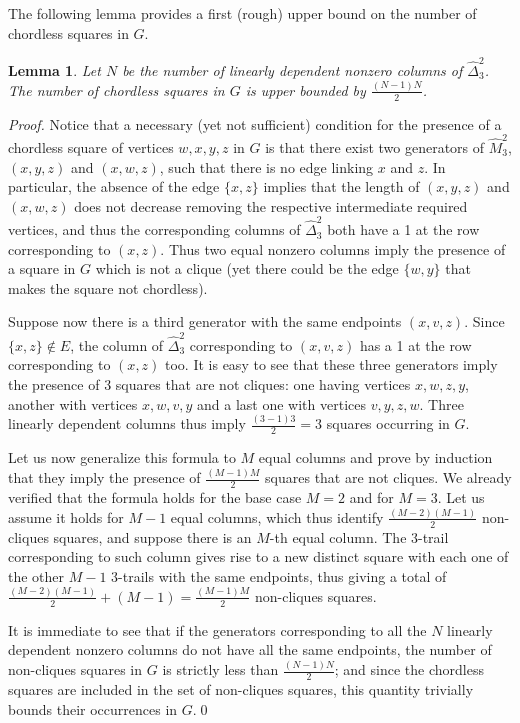 \documentclass{article}
\newtheorem{lemma}{Lemma}
\begin{document}
	The following lemma provides a first (rough) upper bound on the number of chordless squares in $G$.
	
	\begin{lemma}\label{lem:squares}
		Let $N$ be the number of linearly dependent nonzero columns of $\widehat{\Delta}_3^2$. The number of chordless squares in $G$ is upper bounded by $\frac{(N-1)N}{2}$.
	\end{lemma}
	\begin{proof}
		Notice that a necessary (yet not sufficient) condition for the presence of a chordless square of vertices $w,x,y,z$  in $G$ is that there exist two generators of $\widehat{M}_3^2$, $(x,y,z)$ and $(x,w,z)$, such that there is no edge linking $x$ and $z$. In particular, the absence of the edge $\{x,z\}$ implies that the length of $(x,y,z)$ and $(x,w,z)$ does not decrease removing the respective intermediate required vertices, and thus the corresponding columns of $\widehat{\Delta}_3^2$ both have a 1 at the row corresponding to $(x,z)$. Thus two equal nonzero columns imply the presence of a square in $G$ which is not a clique (yet there could be the edge $\{w,y\}$ that makes the square not chordless). 
		
		Suppose now there is a third generator with the same endpoints $(x,v,z)$. Since $\{x,z\}\notin E$, the column of $\widehat{\Delta}_3^2$ corresponding to $(x,v,z)$ has a 1 at the row corresponding to $(x,z)$ too. It is easy to see that these three generators imply the presence of 3 squares that are not cliques: one having vertices $x,w,z,y$, another with vertices $x,w,v,y$ and a last one with vertices $v,y,z,w$. Three linearly dependent columns thus imply $\frac{(3-1)3}{2}=3$ squares occurring in $G$.
		
		Let us now generalize this formula to $M$ equal columns and prove by induction that they imply the presence of $\frac{(M-1)M}{2}$ squares that are not cliques. We already verified that the formula holds for the base case $M=2$ and for $M=3$. Let us assume it holds for $M-1$ equal columns, which thus identify $\frac{(M-2)(M-1)}{2}$ non-cliques squares, and suppose there is an $M$-th equal column. The $3$-trail corresponding to such column gives rise to a new distinct square with each one of the other $M-1$ $3$-trails with the same endpoints, thus giving a total of $\frac{(M-2)(M-1)}{2} + (M-1)= \frac{(M-1)M}{2}$ non-cliques squares.
		
		It is immediate to see that if the generators corresponding to all the $N$ linearly dependent nonzero columns do not have all the same endpoints, the number of non-cliques squares in $G$ is strictly less than $\frac{(N-1)N}{2}$; and since the chordless squares are included in the set of non-cliques squares, this quantity trivially bounds their occurrences in $G$.\qed
	\end{proof}
	
\end{document}
